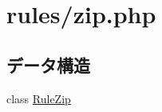 \hypertarget{_zip_8php}{
\section{rules/zip.php}
\label{_zip_8php}
}
\subsection*{データ構造}
\begin{DoxyCompactItemize}
\item 
class \hyperlink{class_rule_zip}{\-Rule\-Zip}
\end{DoxyCompactItemize}
